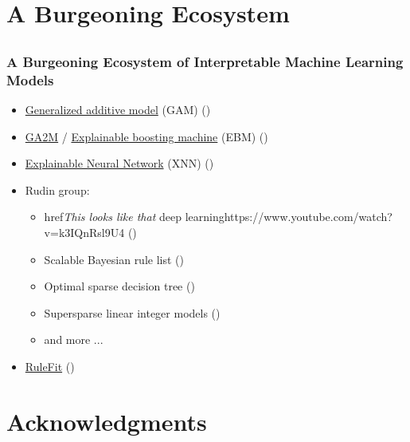 \documentclass[11pt,aspectratio=169,hyperref={colorlinks}]{beamer}
\begin{document}
	\section{A Burgeoning Ecosystem}
			
		\subsection*{}
		
		\begin{frame}
		
			\frametitle{A Burgeoning Ecosystem of Interpretable Machine Learning Models}		
			
			\begin{itemize}
				\item \href{https://www.r-bloggers.com/generalized-additive-models}{Generalized additive model} (GAM) (\cite{esl})
				\item \href{http://www.cs.cornell.edu/~yinlou/projects/gam/}{GA2M} / \href{https://github.com/interpretml/interpret/}{Explainable boosting machine} (EBM) (\cite{ga2m})
				\item \href{https://www.mdpi.com/2078-2489/11/3/137}{Explainable Neural Network} (XNN) (\cite{wf_xnn})
				\item Rudin group: 
				\begin{itemize}
					\item href{\textit{This looks like that} deep learning}{https://www.youtube.com/watch?v=k3IQnRsl9U4} (\cite{this_looks_like_that})
					\item Scalable Bayesian rule list (\cite{sbrl}) 
					\item Optimal sparse decision tree (\cite{osdt})
					\item Supersparse linear integer models (\cite{slim})
					\item and more ... 
				\end{itemize}
				\item \href{https://christophm.github.io/interpretable-ml-book/rulefit.html}{RuleFit} (\cite{rulefit})
			\end{itemize}
		
		\end{frame}
		
\section{Acknowledgments}
\end{document}

